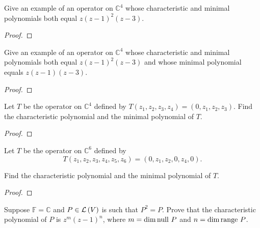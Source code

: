 \begin{exercise}\label{chapter8:sectionB:exercise13}
    Give an example of an operator on $\mathbb{C}^{4}$ whose characteristic and minimal polynomials both equal $z{(z - 1)}^{2}(z - 3)$.
\end{exercise}

\begin{proof}
\end{proof}
\newpage

\begin{exercise}\label{chapter8:sectionB:exercise14}
    Give an example of an operator on $\mathbb{C}^{4}$ whose characteristic and minimal polynomials both equal $z{(z - 1)}^{2}(z - 3)$ and whose minimal polynomial equals $z(z - 1)(z - 3)$.
\end{exercise}

\begin{proof}
\end{proof}
\newpage

\begin{exercise}\label{chapter8:sectionB:exercise15}
    Let $T$ be the operator on $\mathbb{C}^{4}$ defined by $T(z_{1}, z_{2}, z_{3}, z_{4}) = (0, z_{1}, z_{2}, z_{3})$. Find the characteristic polynomial and the minimal polynomial of $T$.
\end{exercise}

\begin{proof}
\end{proof}
\newpage

\begin{exercise}\label{chapter8:sectionB:exercise16}
    Let $T$ be the operator on $\mathbb{C}^{6}$ defined by
    \[
        T(z_{1}, z_{2}, z_{3}, z_{4}, z_{5}, z_{6}) = (0, z_{1}, z_{2}, 0, z_{4}, 0).
    \]

    Find the characteristic polynomial and the minimal polynomial of $T$.
\end{exercise}

\begin{proof}
\end{proof}
\newpage

\begin{exercise}\label{chapter8:sectionB:exercise17}
    Suppose $\mathbb{F} = \mathbb{C}$ and $P\in\mathcal{L}\left({V}\right)$ is such that $P^{2} = P$. Prove that the characteristic polynomial of $P$ is $z^{m}{(z - 1)}^{n}$, where $m = \dim\operatorname{null}\,{P}$ and $n = \dim\operatorname{range}\,{P}$.
\end{exercise}

